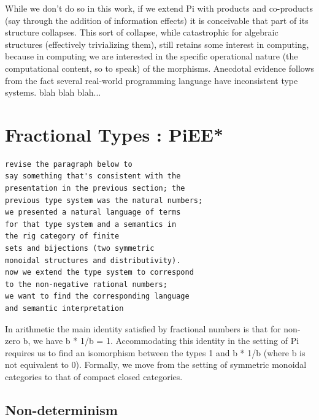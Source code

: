 \documentclass[preprint]{sigplanconf}
\begin{document}
While we don't do so in this work, if we extend {{Pi}} with products
and co-products (say through the addition of information effects) it
is conceivable that part of its structure collapses. This sort of
collapse, while catastrophic for algebraic structures (effectively
trivializing them), still retains some interest in computing, because
in computing we are interested in the specific operational nature (the
computational content, so to speak) of the morphisms. Anecdotal evidence
follows from the fact several real-world programming language have
inconsistent type systems. blah blah blah...

\section{Fractional Types : {{PiEE*}} }
\label{sec:int}

\begin{verbatim}
revise the paragraph below to 
say something that's consistent with the 
presentation in the previous section; the
previous type system was the natural numbers;
we presented a natural language of terms
for that type system and a semantics in 
the rig category of finite
sets and bijections (two symmetric
monoidal structures and distributivity).
now we extend the type system to correspond
to the non-negative rational numbers;
we want to find the corresponding language
and semantic interpretation
\end{verbatim}

In arithmetic the main identity satisfied by fractional numbers is that for
non-zero {{b}}, we have {{b * 1/b = 1}}. Accommodating this identity in the
setting of {{Pi}} requires us to find an isomorphism between the types {{1}}
and {{b * 1/b}} (where {{b}} is not equivalent to {{0}}). Formally, we move
from the setting of symmetric monoidal categories to that of compact closed
categories.

\subsection{Non-determinism} 
\end{document}
